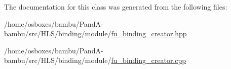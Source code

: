 The documentation for this class was generated from the following files\+:\begin{DoxyCompactItemize}
\item 
/home/osboxes/bambu/\+Pand\+A-\/bambu/src/\+H\+L\+S/binding/module/\hyperlink{fu__binding__creator_8hpp}{fu\+\_\+binding\+\_\+creator.\+hpp}\item 
/home/osboxes/bambu/\+Pand\+A-\/bambu/src/\+H\+L\+S/binding/module/\hyperlink{fu__binding__creator_8cpp}{fu\+\_\+binding\+\_\+creator.\+cpp}\end{DoxyCompactItemize}
